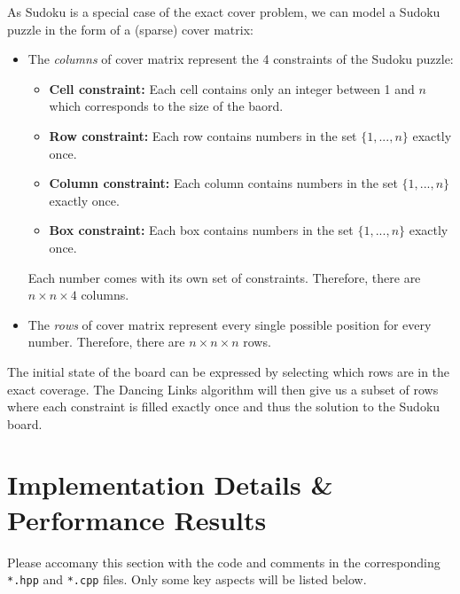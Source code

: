 \documentclass[12pt,a4paper]{article}
\newcommand{\code}[1]{\colorbox{light-gray}{\texttt{#1}}}
\begin{document}
	As Sudoku is a special case of the exact cover problem, we can model a Sudoku puzzle in the form of a (sparse) cover matrix:
	\begin{itemize}
		\item The \textit{columns} of cover matrix represent the \num{4} constraints of the Sudoku puzzle:
		\begin{itemize}
			\item \textbf{Cell constraint:} Each cell contains only an integer between \num{1} and $n$ which corresponds to the size of the baord.
			\item \textbf{Row constraint:} Each row contains numbers in the set $\{1, ... , n\}$ exactly once.
			\item \textbf{Column constraint:} Each column contains numbers in the set $\{1, ... , n\}$ exactly once.
			\item \textbf{Box constraint:} Each box contains numbers in the set $\{1, ... , n\}$ exactly once.
		\end{itemize}
		Each number comes with its own set of constraints. Therefore, there are \textbf{$n \times n \times 4$} columns.
		\item The \textit{rows} of cover matrix represent every single possible position for every number.
		Therefore, there are \textbf{$n \times n \times n$} rows.
	\end{itemize}

	The initial state of the board can be expressed by selecting which rows are in the exact coverage.
	The Dancing Links algorithm will then give us a subset of rows where each constraint is filled exactly once and thus the solution to the Sudoku board.


\newpage %
\section{Implementation Details \& Performance Results}
	Please accomany this section with the code and comments in the corresponding \code{*.hpp} and \code{*.cpp} files.
	Only some key aspects will be listed below.
\end{document}
